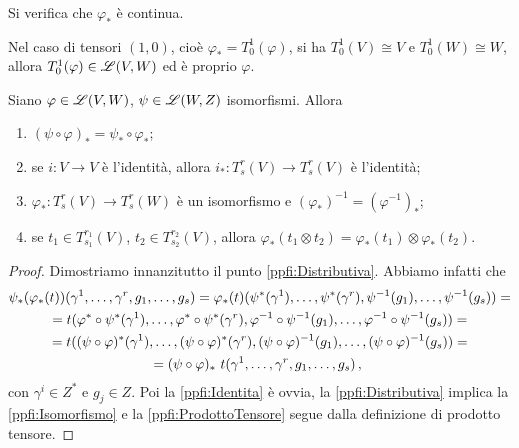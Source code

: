 \begin{remark}
Si verifica che $\varphi_*$ è continua.
\end{remark}

\begin{remark}
	Nel caso di tensori $(1,0)$, cioè $\varphi_*=T_0^1(\varphi)$, si ha $T_0^1(V)\cong V$ e $T_0^1(W)\cong W$, allora $T_0^1(\varphi) \in \mathscr L(V,W)$ ed è proprio $\varphi$.
\end{remark}

\begin{proposition} \label{prop:ProprietaPushForwardIsomorfismi}
	Siano $\varphi\in \mathscr L(V,W)$, $\psi\in \mathscr L(W,Z)$ isomorfismi. Allora
	\begin{enumerate}
	 \item $(\psi\circ\varphi)_* = \psi_*\circ \varphi_*$; \label{ppfi:Distributiva}
	 \item se $i:V\to V$ è l'identità, allora $i_*:T_s^r(V) \to T_s^r(V)$ è l'identità; \label{ppfi:Identita}
	 \item $\varphi_*:T_s^r(V) \to T_s^r(W)$ è un isomorfismo e $(\varphi_*)^{-1} = (\varphi^{-1})_*$; \label{ppfi:Isomorfismo}
	 \item se $t_1\in T_{s_1}^{r_1}(V)$, $t_2\in T_{s_2}^{r_2}(V)$, allora $\varphi_*(t_1\otimes t_2) = \varphi_*(t_1)\otimes \varphi_*(t_2)$. \label{ppfi:ProdottoTensore}
	\end{enumerate}
\end{proposition}
\begin{proof}
	Dimostriamo innanzitutto il punto \ref{ppfi:Distributiva}. Abbiamo infatti che
	\begin{multline*}
		\psi_*(\varphi_*(t)) (\gamma^1,\ldots,\gamma^r,g_1,\ldots,g_s) = \varphi_*(t) (\psi^*(\gamma^1),\ldots,\psi^*(\gamma^r), \psi^{-1}(g_1),\ldots, \psi^{-1}(g_s)) =\\
		= t(\varphi^*\circ \psi^*(\gamma^1),\ldots, \varphi^*\circ \psi^*(\gamma^r), \varphi^{-1}\circ \psi^{-1}(g_1), \ldots, \varphi^{-1}\circ \psi^{-1}(g_s) ) =\\
		= t((\psi\circ\varphi)^*(\gamma^1),\ldots, (\psi\circ\varphi)^*(\gamma^r), (\psi\circ\varphi)^{-1}(g_1), \ldots, (\psi\circ\varphi)^{-1}(g_s) ) = \\
		= (\psi\circ\varphi)_*\ t (\gamma^1,\ldots,\gamma^r,g_1,\ldots,g_s)\, \text{, }
	\end{multline*}
	con $\gamma^i\in Z^*$ e $g_j\in Z$.
	Poi la \ref{ppfi:Identita} è ovvia, la \ref{ppfi:Distributiva} implica la \ref{ppfi:Isomorfismo} e la \ref{ppfi:ProdottoTensore} segue dalla definizione di prodotto tensore.
\end{proof}

